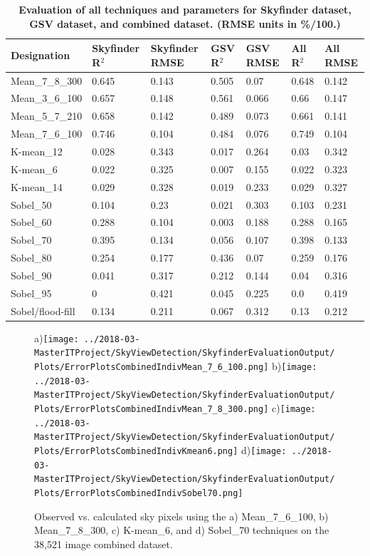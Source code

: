 \documentclass[final,3p,times,authoryear]{elsarticle}
\begin{document}
\begin{table}[!htbp]
\caption{\bf Evaluation of all techniques and parameters for Skyfinder dataset, GSV dataset, and combined dataset. (RMSE units in \%/100.) \label{tab:evalall}}     
\begin{tabular}{ l  l l l l l l}
\textbf{Designation}  & \textbf{Skyfinder R$^{2}$} & \textbf{Skyfinder RMSE} & \textbf{GSV R$^{2}$} & \textbf{GSV RMSE} & \textbf{All R$^{2}$} & \textbf{All RMSE}  \\ \hline
Mean\_7\_8\_300 &0.645&0.143&0.505&0.07&0.648&0.142 \\
Mean\_3\_6\_100	&0.657&0.148&0.561&0.066&0.66&0.147 \\
Mean\_5\_7\_210	 &0.658&0.142&0.489&0.073&0.661&0.141 \\
Mean\_7\_6\_100	 &0.746&0.104&0.484&0.076&0.749&0.104 \\
K-mean\_12   &0.028&0.343&0.017&0.264&0.03&0.342 \\
K-mean\_6   &0.022&0.325&0.007&0.155&0.022&0.323 \\
K-mean\_14   &0.029&0.328&0.019&0.233&0.029&0.327 \\
Sobel\_50  &0.104&0.23&0.021&0.303&0.103&0.231 \\
Sobel\_60  &0.288&0.104&0.003&0.188&0.288&0.165 \\
Sobel\_70  &0.395&0.134&0.056&0.107&0.398&0.133 \\
Sobel\_80  &0.254&0.177&0.436&0.07&0.259&0.176 \\
Sobel\_90  &0.041&0.317&0.212&0.144&0.04&0.316 \\
Sobel\_95 &0&0.421&0.045&0.225&0.0&0.419 \\
Sobel/flood-fill &0.134&0.211&0.067&0.312&0.13&0.212 \\
\hline
\end{tabular}
\end{table}



\begin{figure}
\centering
a)\texttt{[image: ../2018-03-MasterITProject/SkyViewDetection/SkyfinderEvaluationOutput/Plots/ErrorPlotsCombinedIndivMean\_7\_6\_100.png]}
b)\texttt{[image: ../2018-03-MasterITProject/SkyViewDetection/SkyfinderEvaluationOutput/Plots/ErrorPlotsCombinedIndivMean\_7\_8\_300.png]}
c)\texttt{[image: ../2018-03-MasterITProject/SkyViewDetection/SkyfinderEvaluationOutput/Plots/ErrorPlotsCombinedIndivKmean6.png]}
d)\texttt{[image: ../2018-03-MasterITProject/SkyViewDetection/SkyfinderEvaluationOutput/Plots/ErrorPlotsCombinedIndivSobel70.png]}
\caption{Observed vs. calculated sky pixels using the a) Mean\_7\_6\_100, b) Mean\_7\_8\_300, c) K-mean\_6, and d) Sobel\_70 techniques on the 38,521 image combined dataset. }
\label{fig:errorallcombined}
\end{figure}
\end{document}

